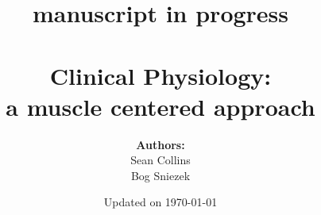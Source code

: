 
% 




\title{manuscript in progress \\~\\ {\bf{\huge{Clinical Physiology:}}  \\ a muscle centered approach}}

\author{\textbf{Authors:} \\ Sean Collins \\ Bog Sniezek \\}

\date{Updated on \today}
\maketitle

\pagebreak
\thispagestyle{empty}

